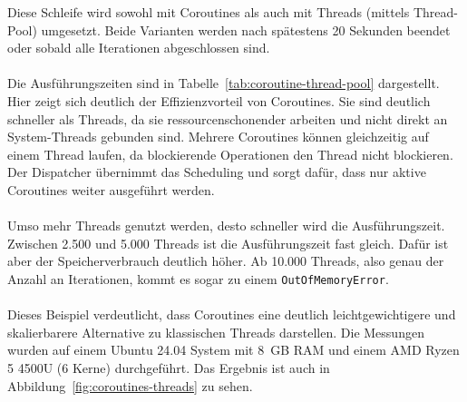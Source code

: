 \documentclass[11pt]{article}
\begin{document}
    Diese Schleife wird sowohl mit Coroutines als auch mit Threads (mittels Thread-Pool) umgesetzt.
    Beide Varianten werden nach spätestens 20 Sekunden beendet oder sobald alle Iterationen abgeschlossen sind.\\
    \\
    Die Ausführungszeiten sind in Tabelle~\ref{tab:coroutine-thread-pool} dargestellt.
    Hier zeigt sich deutlich der Effizienzvorteil von Coroutines.
    Sie sind deutlich schneller als Threads, da sie ressourcenschonender arbeiten und nicht direkt an System-Threads gebunden sind.
    Mehrere Coroutines können gleichzeitig auf einem Thread laufen, da blockierende Operationen den Thread nicht blockieren.
    Der Dispatcher übernimmt das Scheduling und sorgt dafür, dass nur aktive Coroutines weiter ausgeführt werden.\\
    \\
    Umso mehr Threads genutzt werden, desto schneller wird die Ausführungszeit.
    Zwischen 2.500 und 5.000 Threads ist die Ausführungszeit fast gleich.
    Dafür ist aber der Speicherverbrauch deutlich höher.
    Ab 10.000 Threads, also genau der Anzahl an Iterationen, kommt es sogar zu einem \texttt{OutOfMemoryError}.\\
    \\
    Dieses Beispiel verdeutlicht, dass Coroutines eine deutlich leichtgewichtigere und skalierbarere Alternative zu klassischen Threads darstellen.
    Die Messungen wurden auf einem Ubuntu 24.04 System mit 8~GB RAM und einem AMD Ryzen 5 4500U (6 Kerne) durchgeführt.
    Das Ergebnis ist auch in Abbildung~\ref{fig:coroutines-threads} zu sehen.\\
    \\
\end{document}
